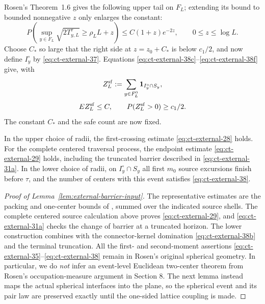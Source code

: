 Rosen's Theorem~1.6 gives the following upper tail on $F_L$; extending
its bound to bounded nonnegative $z$ only enlarges the constant:
\begin{equation}
P\left(\sup_{y\in F_L}\sqrt{2T_{y,L}^{\tau}}\ge\rho_LL+z\right)
       \le C(1+z)e^{-2z},\qquad0\le z\le\log L.\label{eq:ct-external-38f}
\end{equation}
Choose $C_*$ so large that the right side at $z=z_0+C_*$
is below $c_1/2$, and now define $I_y^\circ$ by \eqref{eq:ct-external-37}.  Equations
\eqref{eq:ct-external-38c}--\eqref{eq:ct-external-38f} give, with
\[
Z_L^{\rm sf}:=\sum_{y\in F_L^0}{\bf1}_{I_y^\circ\cap S_y},
\]
\begin{equation}
EZ_L^{\rm sf}\le C,\qquad P(Z_L^{\rm sf}>0)\ge c_1/2.\label{eq:ct-external-38}
\end{equation}
The constant $C_*$ and the safe count are now fixed.

\begin{lemma}\label{lem:external-barrier-input}
In the upper choice of radii, the first-crossing estimate
\eqref{eq:ct-external-28} holds.  For the complete centered traversal process,
the endpoint estimate \eqref{eq:ct-external-29} holds, including the truncated
barrier described in \eqref{eq:ct-external-31a}.  In the lower choice of radii,
on $I_y^\circ\cap S_y$ all first $m_0$ source excursions finish before
$\tau$, and the number of centers with this event satisfies
\eqref{eq:ct-external-38}.
\end{lemma}

\begin{proof}[Proof of Lemma~\ref{lem:external-barrier-input}]
The representative estimates are the packing and one-center bounds of
\cite[Proposition~2.5, (2.34)--(2.35)]{Rosen2022}, summed over the indicated
source shells.  The complete centered source calculation above proves
\eqref{eq:ct-external-29}, and \eqref{eq:ct-external-31a} checks the change of
barrier at a truncated horizon.  The lower construction combines
\cite[Lemmas~3.3--3.4]{Rosen2022} with the connector-kernel domination
\eqref{eq:ct-external-38b} and the terminal truncation.
All the first- and second-moment assertions \eqref{eq:ct-external-35}--\eqref{eq:ct-external-38} remain in Rosen's
original spherical geometry.  In particular, we do \emph{not} infer an
event-level Euclidean two-center theorem from Rosen's occupation-measure
argument in Section 8.  The next lemma instead maps the actual spherical
interfaces into the plane, so the spherical event and its pair law are
preserved exactly until the one-sided lattice coupling is made.
\end{proof}

